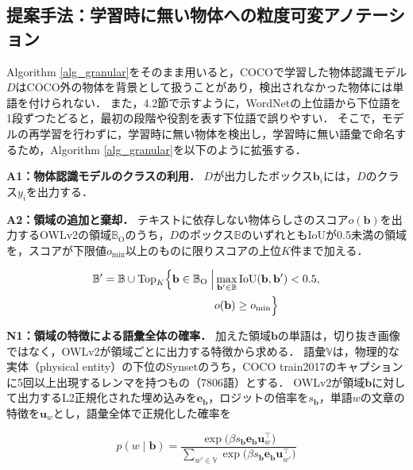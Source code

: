 \subsection{提案手法：学習時に無い物体への粒度可変アノテーション}
Algorithm \ref{alg_granular}をそのまま用いると，COCOで学習した物体認識モデル$ D $はCOCO外の物体を背景として扱うことがあり，検出されなかった物体には単語を付けられない．
また，4.2節で示すように，WordNetの上位語から下位語を1段ずつたどると，最初の段階や役割を表す下位語で誤りやすい．
そこで，モデルの再学習を行わずに，学習時に無い物体を検出し，学習時に無い語彙で命名するため，Algorithm \ref{alg_granular}を以下のように拡張する．

{\bf A1：物体認識モデルのクラスの利用．}
$ D $が出力したボックス$ {\mathbf b}_i $には，$ D $のクラス$ y_i $を出力する．

{\bf A2：領域の追加と棄却．}
テキストに依存しない物体らしさのスコア$ o({\mathbf b}) $を出力するOWLv2\cite{ref_OWLv2}の領域$ {\mathbb B}_{\mathrm{O}} $のうち，$ D $のボックス$ {\mathbb B} $のいずれともIoUが0.5未満の領域を，スコアが下限値$ o_{\min} $以上のものに限りスコアの上位$ K $件まで加える．

\begin{equation}
    \begin{aligned}
    {\mathbb B}' = {\mathbb B} \cup \mathrm{Top}_K \Bigl\{ {\mathbf b} \in {\mathbb B}_{\mathrm{O}} \Bigm| & \max_{{\mathbf b}' \in {\mathbb B}} \mathrm{IoU}({\mathbf b}, {\mathbf b}') < 0.5, \\
    & o({\mathbf b}) \geq o_{\min} \Bigr\}
    \end{aligned}
    \label{eq_add}
\end{equation}

{\bf N1：領域の特徴による語彙全体の確率．}
加えた領域$ {\mathbf b} $の単語は，切り抜き画像ではなく，OWLv2が領域ごとに出力する特徴から求める．
語彙$ {\mathbb V} $は，物理的な実体（physical entity）の下位のSynsetのうち，COCO train2017のキャプションに5回以上出現するレンマを持つもの（7806語）とする．
OWLv2が領域$ {\mathbf b} $に対して出力するL2正規化された埋め込みを$ {\mathbf e}_{\mathbf b} $，ロジットの倍率を$ s_{\mathbf b} $，単語$ w $の文章の特徴を$ {\mathbf u}_w $とし，語彙全体で正規化した確率を

\begin{equation}
    p(w \mid {\mathbf b}) = \frac{\exp \bigl( \beta s_{\mathbf b} {\mathbf e}_{\mathbf b} {\mathbf u}_w^{\top} \bigr)}{\sum_{w' \in {\mathbb V}} \exp \bigl( \beta s_{\mathbf b} {\mathbf e}_{\mathbf b} {\mathbf u}_{w'}^{\top} \bigr)}
    \label{eq_prob}
\end{equation}

